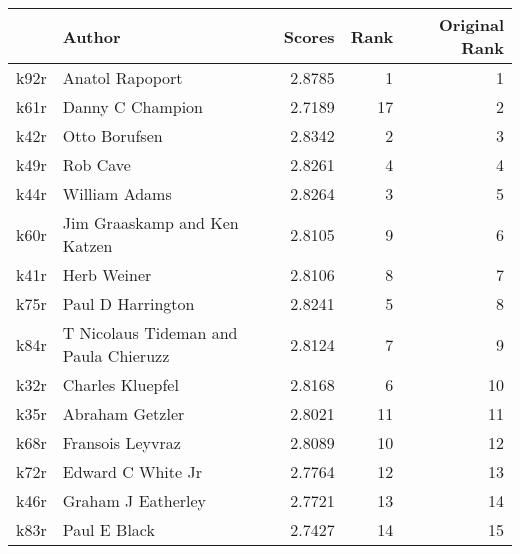 \begin{tabular}{llrrr}
\toprule
{} &                                 Author &  Scores &  Rank &  Original Rank \\
\midrule
k92r &                        Anatol Rapoport &  2.8785 &     1 &              1 \\
k61r &                       Danny C Champion &  2.7189 &    17 &              2 \\
k42r &                          Otto Borufsen &  2.8342 &     2 &              3 \\
k49r &                               Rob Cave &  2.8261 &     4 &              4 \\
k44r &                          William Adams &  2.8264 &     3 &              5 \\
k60r &           Jim Graaskamp and Ken Katzen &  2.8105 &     9 &              6 \\
k41r &                            Herb Weiner &  2.8106 &     8 &              7 \\
k75r &                      Paul D Harrington &  2.8241 &     5 &              8 \\
k84r &  T Nicolaus Tideman and Paula Chieruzz &  2.8124 &     7 &              9 \\
k32r &                       Charles Kluepfel &  2.8168 &     6 &             10 \\
k35r &                        Abraham Getzler &  2.8021 &    11 &             11 \\
k68r &                       Fransois Leyvraz &  2.8089 &    10 &             12 \\
k72r &                      Edward C White Jr &  2.7764 &    12 &             13 \\
k46r &                     Graham J Eatherley &  2.7721 &    13 &             14 \\
k83r &                           Paul E Black &  2.7427 &    14 &             15 \\
\bottomrule
\end{tabular}
